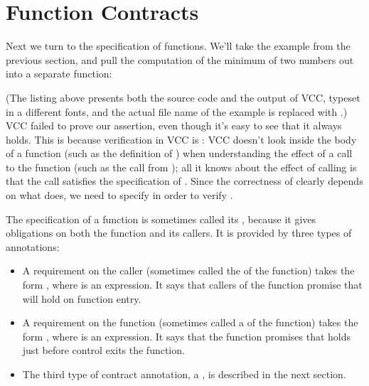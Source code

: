 \section{Function Contracts}
\label{sect:functions}

Next we turn to the specification of functions. We'll take the example
from the previous section, and pull the computation of the minimum of
two numbers out into a separate function:


(The listing above presents both the source code and the output
of VCC, typeset in a different fonts, and 
the actual file name of the example is replaced with .)
VCC failed to prove our assertion, even though it's easy to see that
it always holds. This is because verification in VCC is : 
VCC doesn't look inside the body of a function (such as the definition of ) 
when understanding the effect of a call to the function (such as 
the call from );
all it knows about the effect of calling  is that the call 
satisfies the specification of . 
Since the correctness of  clearly depends on what 
does, we need to specify  in order to verify .

The specification of a function is sometimes called its ,
because it gives obligations on both the function and its callers. It
is provided by three types of annotations:
\begin{itemize}
\item A requirement on the caller (sometimes called the
   of the function) takes the form , 
  where  is an expression. It says that callers of the
  function promise that  will hold on function entry. 

\item A requirement on the function (sometimes called a
   of the function) takes the form , 
  where  is an expression. It says that the function
  promises that  holds just before control exits the
  function. 

\item The third type of contract annotation, a , is described
  in the next section.
\end{itemize}

